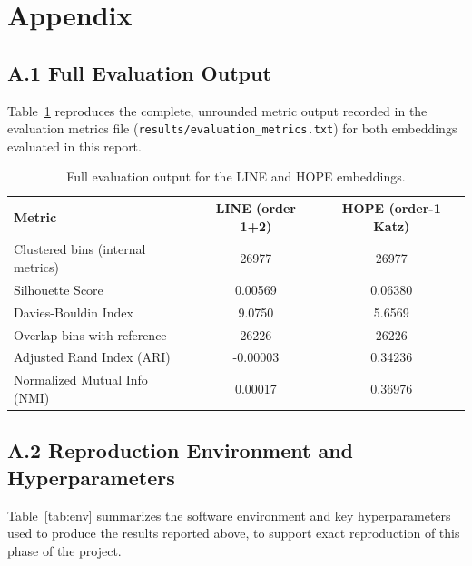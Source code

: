 \documentclass[12pt]{article}
\begin{document}
\section{Appendix}

\subsection*{A.1 Full Evaluation Output}
Table~\ref{tab:appendix} reproduces the complete, unrounded metric output recorded in the
evaluation metrics file (\texttt{results/evaluation\_metrics.txt}) for both embeddings evaluated
in this report.

\begin{table}[h]
\centering
\small
\caption{Full evaluation output for the LINE and HOPE embeddings.}
\label{tab:appendix}
\begin{tabular}{lcc}
\toprule
\textbf{Metric} & \textbf{LINE (order 1+2)} & \textbf{HOPE (order-1 Katz)} \\
\midrule
Clustered bins (internal metrics) & 26977 & 26977 \\
Silhouette Score & 0.00569 & 0.06380 \\
Davies-Bouldin Index & 9.0750 & 5.6569 \\
Overlap bins with reference & 26226 & 26226 \\
Adjusted Rand Index (ARI) & -0.00003 & 0.34236 \\
Normalized Mutual Info (NMI) & 0.00017 & 0.36976 \\
\bottomrule
\end{tabular}
\end{table}

\subsection*{A.2 Reproduction Environment and Hyperparameters}
Table~\ref{tab:env} summarizes the software environment and key hyperparameters used to
produce the results reported above, to support exact reproduction of this phase of the project.
\end{document}
